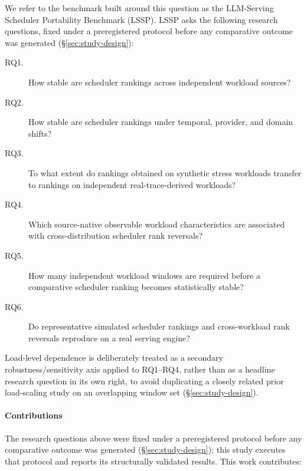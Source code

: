 We refer to the benchmark built around this question as the LLM-Serving
Scheduler Portability Benchmark (LSSP). LSSP asks the following research
questions, fixed under a preregistered protocol before any comparative
outcome was generated (\S\ref{sec:study-design}):

\begin{description}
  \item[RQ1.] How stable are scheduler rankings across independent
    workload sources?
  \item[RQ2.] How stable are scheduler rankings under temporal, provider,
    and domain shifts?
  \item[RQ3.] To what extent do rankings obtained on synthetic stress
    workloads transfer to rankings on independent real-trace-derived
    workloads?
  \item[RQ4.] Which source-native observable workload characteristics are
    associated with cross-distribution scheduler rank reversals?
  \item[RQ5.] How many independent workload windows are required before a
    comparative scheduler ranking becomes statistically stable?
  \item[RQ6.] Do representative simulated scheduler rankings and
    cross-workload rank reversals reproduce on a real serving engine?
\end{description}

Load-level dependence is deliberately treated as a secondary
robustness/sensitivity axis applied to RQ1--RQ4, rather than as a headline
research question in its own right, to avoid duplicating a closely related
prior load-scaling study on an overlapping window set
(\S\ref{sec:study-design}).

\paragraph{Contributions} The research questions above were fixed under a
preregistered protocol before any comparative outcome was generated
(\S\ref{sec:study-design}); this study executes that protocol and reports
its structurally validated results. This work contributes:

